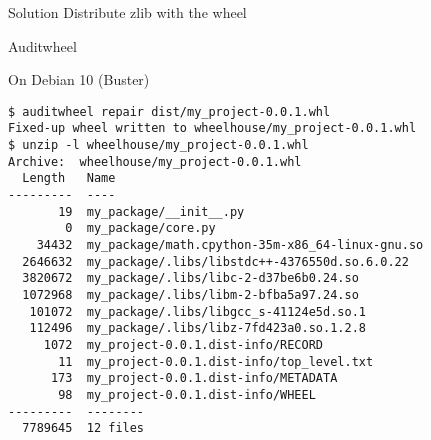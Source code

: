 \documentclass[pdf]{beamer}
\begin{document}
\begin{frame}
\end{frame}

\begin{frame}
    \begin{block}{Solution}
        Distribute zlib with the wheel
    \end{block}

    \note {
    }
\end{frame}

\begin{frame}[fragile]{Auditwheel}
    \begin{block}{On Debian 10 (Buster)}
        \begin{lstlisting}
$ auditwheel repair dist/my_project-0.0.1.whl
Fixed-up wheel written to wheelhouse/my_project-0.0.1.whl
$ unzip -l wheelhouse/my_project-0.0.1.whl
Archive:  wheelhouse/my_project-0.0.1.whl
  Length   Name
---------  ----
       19  my_package/__init__.py
        0  my_package/core.py
    34432  my_package/math.cpython-35m-x86_64-linux-gnu.so
  2646632  my_package/.libs/libstdc++-4376550d.so.6.0.22
  3820672  my_package/.libs/libc-2-d37be6b0.24.so
  1072968  my_package/.libs/libm-2-bfba5a97.24.so
   101072  my_package/.libs/libgcc_s-41124e5d.so.1
   112496  my_package/.libs/libz-7fd423a0.so.1.2.8
     1072  my_project-0.0.1.dist-info/RECORD
       11  my_project-0.0.1.dist-info/top_level.txt
      173  my_project-0.0.1.dist-info/METADATA
       98  my_project-0.0.1.dist-info/WHEEL
---------  --------
  7789645  12 files
        \end{lstlisting}
    \end{block}
\end{frame}
\end{document}

